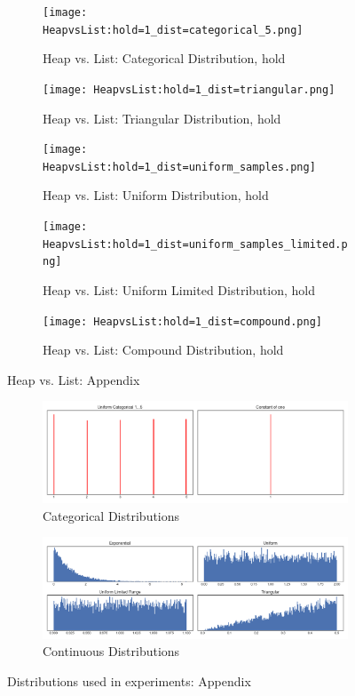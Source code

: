 \documentclass{article}
\begin{document}
\begin{figure}[H]
\centering
    \begin{subfigure}[H]{0.4\linewidth}
    \texttt{[image: HeapvsList:hold=1\_dist=categorical\_5.png]}
    \caption{Heap vs. List: Categorical Distribution, hold}
    \end{subfigure}
    \begin{subfigure}[H]{0.4\linewidth}
    \texttt{[image: HeapvsList:hold=1\_dist=triangular.png]}
    \caption{Heap vs. List: Triangular Distribution, hold}
    \end{subfigure}
    \begin{subfigure}[H]{0.4\linewidth}
    \texttt{[image: HeapvsList:hold=1\_dist=uniform\_samples.png]}
    \caption{Heap vs. List: Uniform Distribution, hold}
    \end{subfigure}
    \begin{subfigure}[H]{0.4\linewidth}
    \texttt{[image: HeapvsList:hold=1\_dist=uniform\_samples\_limited.png]}
    \caption{Heap vs. List: Uniform Limited Distribution, hold}
    \end{subfigure}
    \begin{subfigure}[H]{0.4\linewidth}
    \texttt{[image: HeapvsList:hold=1\_dist=compound.png]}
    \caption{Heap vs. List: Compound Distribution, hold}
    \end{subfigure}
\caption{Heap vs. List: Appendix}
\label{fig:heap_vs_list:appendix}
\end{figure}

\begin{figure}[H]
\centering
    \begin{subfigure}[H]{0.8\linewidth}
    \includegraphics[width=\linewidth]{input_distributions_cat.png}
    \caption{Categorical Distributions}
    \end{subfigure}
    \begin{subfigure}[H]{0.8\linewidth}
    \includegraphics[width=\linewidth]{input_distributions_cont.png}
    \caption{Continuous Distributions}
    \end{subfigure}
\caption{Distributions used in experiments: Appendix}
\label{fig:distributions_used}
\end{figure}
\end{document}
